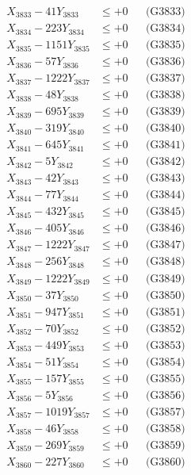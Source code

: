 \documentclass[a4paper,10pt]{article}
\begin{document}
{\begin{align}
X_{3833} - 41Y_{3833} &\leq +0 && \text{(G3833)} \\
X_{3834} - 223Y_{3834} &\leq +0 && \text{(G3834)} \\
X_{3835} - 1151Y_{3835} &\leq +0 && \text{(G3835)} \\
X_{3836} - 57Y_{3836} &\leq +0 && \text{(G3836)} \\
X_{3837} - 1222Y_{3837} &\leq +0 && \text{(G3837)} \\
X_{3838} - 48Y_{3838} &\leq +0 && \text{(G3838)} \\
X_{3839} - 695Y_{3839} &\leq +0 && \text{(G3839)} \\
X_{3840} - 319Y_{3840} &\leq +0 && \text{(G3840)} \\
\allowbreak
X_{3841} - 645Y_{3841} &\leq +0 && \text{(G3841)} \\
X_{3842} - 5Y_{3842} &\leq +0 && \text{(G3842)} \\
X_{3843} - 42Y_{3843} &\leq +0 && \text{(G3843)} \\
X_{3844} - 77Y_{3844} &\leq +0 && \text{(G3844)} \\
X_{3845} - 432Y_{3845} &\leq +0 && \text{(G3845)} \\
X_{3846} - 405Y_{3846} &\leq +0 && \text{(G3846)} \\
X_{3847} - 1222Y_{3847} &\leq +0 && \text{(G3847)} \\
X_{3848} - 256Y_{3848} &\leq +0 && \text{(G3848)} \\
X_{3849} - 1222Y_{3849} &\leq +0 && \text{(G3849)} \\
X_{3850} - 37Y_{3850} &\leq +0 && \text{(G3850)} \\
\allowbreak
X_{3851} - 947Y_{3851} &\leq +0 && \text{(G3851)} \\
X_{3852} - 70Y_{3852} &\leq +0 && \text{(G3852)} \\
X_{3853} - 449Y_{3853} &\leq +0 && \text{(G3853)} \\
X_{3854} - 51Y_{3854} &\leq +0 && \text{(G3854)} \\
X_{3855} - 157Y_{3855} &\leq +0 && \text{(G3855)} \\
X_{3856} - 5Y_{3856} &\leq +0 && \text{(G3856)} \\
X_{3857} - 1019Y_{3857} &\leq +0 && \text{(G3857)} \\
X_{3858} - 46Y_{3858} &\leq +0 && \text{(G3858)} \\
X_{3859} - 269Y_{3859} &\leq +0 && \text{(G3859)} \\
X_{3860} - 227Y_{3860} &\leq +0 && \text{(G3860)} \\

\end{align}}
\end{document}
